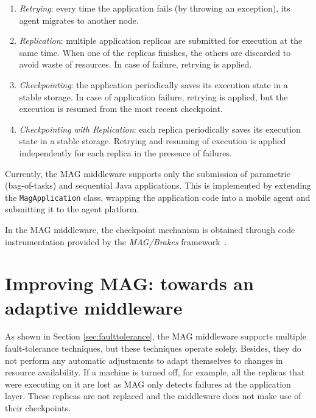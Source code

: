 \documentclass{sig-alternate}
\begin{document}
\begin{enumerate}
    \item \emph{Retrying}: every time the application fails (by throwing an exception), its agent migrates to another node.

    \item \emph{Replication}: multiple application replicas are submitted
for execution at the same time. When one of the replicas finishes, the others
are discarded to avoid waste of resources. In case of failure,
retrying is applied.
   
    \item \emph{Checkpointing}: the application periodically saves its execution
state in a stable storage. In case of application failure, retrying is
applied, but the execution is resumed from the most recent checkpoint.
 
    \item \emph{Checkpointing with Replication}: each replica periodically saves
its execution state in a stable storage. Retrying and resuming of execution is
applied independently for each replica in the presence of failures.

\end{enumerate}

Currently, the MAG middleware supports only the submission of parametric (bag-of-tasks) and
sequential Java applications. This is implemented by extending
the {\tt MagApplication} class, wrapping the application code into a mobile agent and submitting
it to the agent platform. 

In the MAG middleware, the checkpoint mechanism is obtained through code
instrumentation provided by the \emph{MAG/Brakes} framework~\cite{brakes00}.

\section{Improving MAG: towards an adaptive middleware}\label{sec:adapt}

As shown in Section \ref{sec:faulttolerance}, the MAG middleware supports
multiple fault-tolerance techniques, but these techniques operate solely.
Besides, they do not perform any automatic adjustments to adapt themselves
to changes in resource availability. If a machine is turned off, for
example, all the replicas that were executing on it are lost as MAG only
detects failures at the application layer. These replicas are not replaced and
the middleware does not make use of their checkpoints.
\end{document}
